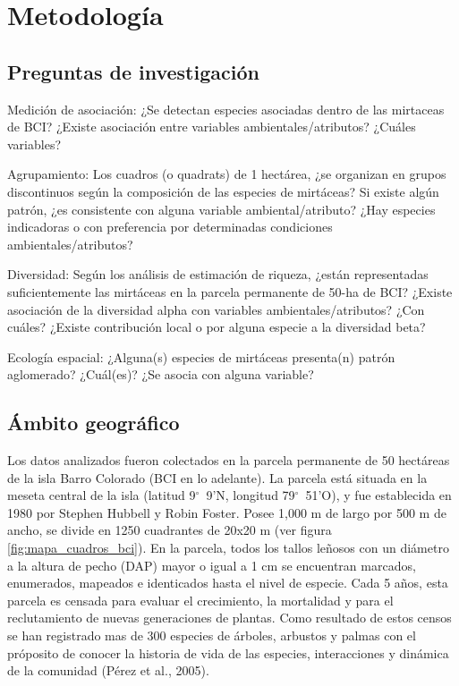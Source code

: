 \documentclass[11pt,]{article}
\begin{document}
\section{Metodología}\label{metodologuxeda}

\subsection{Preguntas de
investigación}\label{preguntas-de-investigaciuxf3n}

Medición de asociación: ¿Se detectan especies asociadas dentro de las
mirtaceas de BCI? ¿Existe asociación entre variables
ambientales/atributos? ¿Cuáles variables?

Agrupamiento: Los cuadros (o quadrats) de 1 hectárea, ¿se organizan en
grupos discontinuos según la composición de las especies de mirtáceas?
Si existe algún patrón, ¿es consistente con alguna variable
ambiental/atributo? ¿Hay especies indicadoras o con preferencia por
determinadas condiciones ambientales/atributos?

Diversidad: Según los análisis de estimación de riqueza, ¿están
representadas suficientemente las mirtáceas en la parcela permanente de
50-ha de BCI? ¿Existe asociación de la diversidad alpha con variables
ambientales/atributos? ¿Con cuáles? ¿Existe contribución local o por
alguna especie a la diversidad beta?

Ecología espacial: ¿Alguna(s) especies de mirtáceas presenta(n) patrón
aglomerado? ¿Cuál(es)? ¿Se asocia con alguna variable?

\subsection{Ámbito geográfico}\label{uxe1mbito-geogruxe1fico}

Los datos analizados fueron colectados en la parcela permanente de 50
hectáreas de la isla Barro Colorado (BCI en lo adelante). La parcela
está situada en la meseta central de la isla (latitud 9\(^\circ\)~9'N,
longitud 79\(^\circ\)~51'O), y fue establecida en 1980 por Stephen
Hubbell y Robin Foster. Posee 1,000 m de largo por 500 m de ancho, se
divide en 1250 cuadrantes de 20x20 m (ver figura
\ref{fig:mapa_cuadros_bci}). En la parcela, todos los tallos leñosos con
un diámetro a la altura de pecho (DAP) mayor o igual a 1 cm se
encuentran marcados, enumerados, mapeados e identicados hasta el nivel
de especie. Cada 5 años, esta parcela es censada para evaluar el
crecimiento, la mortalidad y para el reclutamiento de nuevas
generaciones de plantas. Como resultado de estos censos se han
registrado mas de 300 especies de árboles, arbustos y palmas con el
próposito de conocer la historia de vida de las especies, interacciones
y dinámica de la comunidad (Pérez et al., 2005).
\end{document}
